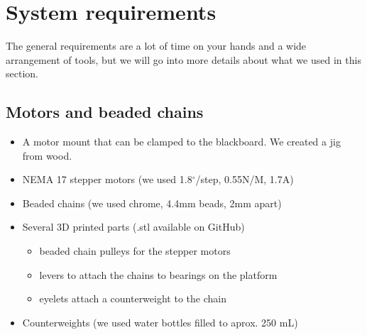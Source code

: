 \documentclass[a4paper,10pt]{article}
\begin{document}

\section{System requirements}
\label{sec:sysreq}
The general requirements are a lot of time on your hands and a wide
arrangement of tools, but we will go into more details about what
we used in this section.

\subsection*{Motors and beaded chains}
\begin{itemize}
  \item A motor mount that can be clamped to the blackboard. We created a jig from wood.
  \item NEMA 17 stepper motors (we used 1.8$^\circ$/step, 0.55N/M, 1.7A)
  \item Beaded chains (we used chrome, 4.4mm beads, 2mm apart)
  \item Several 3D printed parts (.stl available on GitHub)
  \begin{itemize}
    \item beaded chain pulleys for the stepper motors
    \item levers to attach the chains to bearings on the platform
    \item eyelets attach a counterweight to the chain
  \end{itemize}
  \item Counterweights (we used water bottles filled to aprox. 250 mL)
\end{itemize}
\end{document}
